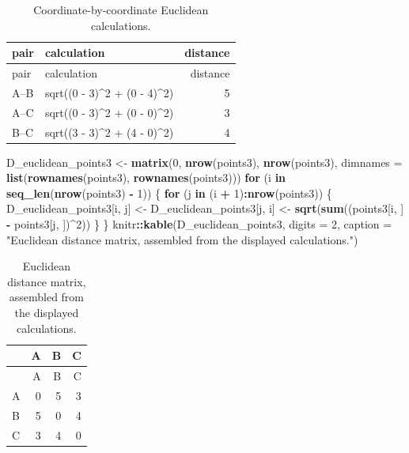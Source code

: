 \documentclass[
  english,
]{article}
\newenvironment{Shaded}{\begin{snugshade}}{\end{snugshade}}
\newcommand{\AttributeTok}[1]{\textcolor[rgb]{0.13,0.29,0.53}{#1}}
\newcommand{\ControlFlowTok}[1]{\textcolor[rgb]{0.13,0.29,0.53}{\textbf{#1}}}
\newcommand{\DecValTok}[1]{\textcolor[rgb]{0.00,0.00,0.81}{#1}}
\newcommand{\FunctionTok}[1]{\textcolor[rgb]{0.13,0.29,0.53}{\textbf{#1}}}
\newcommand{\NormalTok}[1]{#1}
\newcommand{\OtherTok}[1]{\textcolor[rgb]{0.56,0.35,0.01}{#1}}
\newcommand{\SpecialCharTok}[1]{\textcolor[rgb]{0.81,0.36,0.00}{\textbf{#1}}}
\newcommand{\StringTok}[1]{\textcolor[rgb]{0.31,0.60,0.02}{#1}}
\begin{document}
\begin{longtable}[]{@{}llr@{}}
\caption{Coordinate-by-coordinate Euclidean
calculations.}\tabularnewline
\toprule\noalign{}
pair & calculation & distance \\
\midrule\noalign{}
\endfirsthead
\toprule\noalign{}
pair & calculation & distance \\
\midrule\noalign{}
\endhead
\bottomrule\noalign{}
\endlastfoot
A--B & sqrt((0 - 3)\^{}2 + (0 - 4)\^{}2) & 5 \\
A--C & sqrt((0 - 3)\^{}2 + (0 - 0)\^{}2) & 3 \\
B--C & sqrt((3 - 3)\^{}2 + (4 - 0)\^{}2) & 4 \\
\end{longtable}

\begin{Shaded}
\begin{Highlighting}[]
\NormalTok{D\_euclidean\_points3 }\OtherTok{\textless{}{-}} \FunctionTok{matrix}\NormalTok{(}\DecValTok{0}\NormalTok{, }\FunctionTok{nrow}\NormalTok{(points3), }\FunctionTok{nrow}\NormalTok{(points3),}
                              \AttributeTok{dimnames =} \FunctionTok{list}\NormalTok{(}\FunctionTok{rownames}\NormalTok{(points3), }\FunctionTok{rownames}\NormalTok{(points3)))}
\ControlFlowTok{for}\NormalTok{ (i }\ControlFlowTok{in} \FunctionTok{seq\_len}\NormalTok{(}\FunctionTok{nrow}\NormalTok{(points3) }\SpecialCharTok{{-}} \DecValTok{1}\NormalTok{)) \{}
  \ControlFlowTok{for}\NormalTok{ (j }\ControlFlowTok{in}\NormalTok{ (i }\SpecialCharTok{+} \DecValTok{1}\NormalTok{)}\SpecialCharTok{:}\FunctionTok{nrow}\NormalTok{(points3)) \{}
\NormalTok{    D\_euclidean\_points3[i, j] }\OtherTok{\textless{}{-}}\NormalTok{ D\_euclidean\_points3[j, i] }\OtherTok{\textless{}{-}}
      \FunctionTok{sqrt}\NormalTok{(}\FunctionTok{sum}\NormalTok{((points3[i, ] }\SpecialCharTok{{-}}\NormalTok{ points3[j, ])}\SpecialCharTok{\^{}}\DecValTok{2}\NormalTok{))}
\NormalTok{  \}}
\NormalTok{\}}
\NormalTok{knitr}\SpecialCharTok{::}\FunctionTok{kable}\NormalTok{(D\_euclidean\_points3, }\AttributeTok{digits =} \DecValTok{2}\NormalTok{,}
             \AttributeTok{caption =} \StringTok{"Euclidean distance matrix, assembled from the displayed calculations."}\NormalTok{)}
\end{Highlighting}
\end{Shaded}

\begin{longtable}[]{@{}lrrr@{}}
\caption{Euclidean distance matrix, assembled from the displayed
calculations.}\tabularnewline
\toprule\noalign{}
& A & B & C \\
\midrule\noalign{}
\endfirsthead
\toprule\noalign{}
& A & B & C \\
\midrule\noalign{}
\endhead
\bottomrule\noalign{}
\endlastfoot
A & 0 & 5 & 3 \\
B & 5 & 0 & 4 \\
C & 3 & 4 & 0 \\
\end{longtable}
\end{document}
